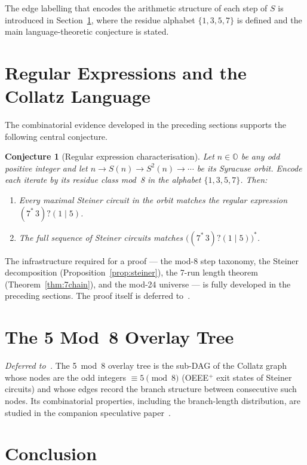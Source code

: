 \documentclass[11pt,a4paper]{article}
\theoremstyle{remark}
\theoremstyle{plain}
\newtheorem{conjecture}[theorem]{Conjecture}
\begin{document}
The edge labelling that encodes the arithmetic structure of each step of $S$
is introduced in Section~\ref{sec:regexp}, where the residue alphabet $\{1,3,5,7\}$
is defined and the main language-theoretic conjecture is stated.

\section{Regular Expressions and the Collatz Language}
\label{sec:regexp}

The combinatorial evidence developed in the preceding sections supports the
following central conjecture.

\begin{conjecture}[Regular expression characterisation]
\label{conj:regexp}
Let $n \in \mathbb{O}$ be any odd positive integer and let
$n \to S(n) \to S^2(n) \to \cdots$ be its Syracuse orbit.
Encode each iterate by its residue class mod~8 in the alphabet $\{1,3,5,7\}$.
Then:
\begin{enumerate}
  \item Every maximal Steiner circuit in the orbit matches the regular expression
        $(7^*\,3)?(1\mid 5)$.
  \item The full sequence of Steiner circuits matches $\bigl((7^*\,3)?(1\mid 5)\bigr)^*$.
\end{enumerate}
\end{conjecture}

The infrastructure required for a proof --- the mod-8 step taxonomy,
the Steiner decomposition (Proposition~\ref{prop:steiner}),
the 7-run length theorem (Theorem~\ref{thm:7chain}),
and the mod-24 universe --- is fully developed in the preceding sections.
The proof itself is deferred to~\cite{paper5}.

\section{The 5 Mod~8 Overlay Tree}
\label{sec:overlay}

\emph{Deferred to~\cite{paper5}.}
The 5~mod~8 overlay tree is the sub-DAG of the Collatz graph whose nodes are the
odd integers $\equiv 5 \pmod{8}$ (OEEE$^+$ exit states of Steiner circuits)
and whose edges record the branch structure between consecutive such nodes.
Its combinatorial properties, including the branch-length distribution, are
studied in the companion speculative paper~\cite{paper65}.

\section{Conclusion}
\label{sec:conclusion}
\end{document}
